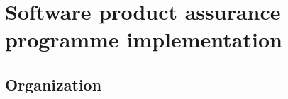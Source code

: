 %




\section{Software product assurance programme implementation}

\subsection{Organization}
\label{subsec:organization}

